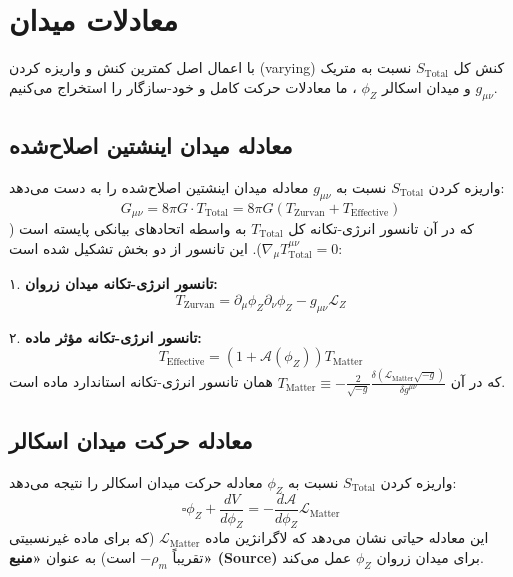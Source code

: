 \documentclass[12pt, a4paper]{article}
\newcommand{\phiZ}{\phi_Z}
\newcommand{\Lmat}{\mathcal{L}_{\text{Matter}}}
\newcommand{\Tmat}{T_{\text{Matter}}}
\newcommand{\Teff}{T_{\text{Effective}}}
\newcommand{\Tzurvan}{T_{\text{Zurvan}}}
\newcommand{\Ttotal}{T_{\text{Total}}}
\newcommand{\Aphi}{\mathcal{A}(\phiZ)}
\begin{document}
\section{معادلات میدان}

با اعمال اصل کمترین کنش و واریزه کردن (varying) کنش کل $S_{\text{Total}}$ نسبت به متریک $g_{\mu\nu}$ و میدان اسکالر $\phiZ$ ، ما معادلات حرکت کامل و خود-سازگار را استخراج می‌کنیم.

\subsection{معادله میدان اینشتین اصلاح‌شده}
واریزه کردن $S_{\text{Total}}$ نسبت به $g_{\mu\nu}$ معادله میدان اینشتین اصلاح‌شده را به دست می‌دهد:
\begin{equation}
G_{\mu\nu} = 8\pi G \cdot \Ttotal = 8\pi G \left( \Tzurvan + \Teff \right)
\end{equation}
که در آن تانسور انرژی-تکانه کل $\Ttotal$ به واسطه اتحادهای بیانکی پایسته است ($\nabla_\mu \Ttotal^{\mu\nu} = 0$). این تانسور از دو بخش تشکیل شده است:

\noindent ۱. \textbf{تانسور انرژی-تکانه میدان زروان:}
\begin{equation}
\Tzurvan = \partial_\mu \phiZ \partial_\nu \phiZ - g_{\mu\nu} \mathcal{L}_Z
\end{equation}

\noindent ۲. \textbf{تانسور انرژی-تکانه مؤثر ماده:}
\begin{equation}
\Teff = (1 + \Aphi) \Tmat
\end{equation}
که در آن $\Tmat \equiv -\frac{2}{\sqrt{-g}} \frac{\delta(\Lmat \sqrt{-g})}{\delta g^{\mu\nu}}$ همان تانسور انرژی-تکانه استاندارد ماده است.

\subsection{معادله حرکت میدان اسکالر}
واریزه کردن $S_{\text{Total}}$ نسبت به $\phiZ$ معادله حرکت میدان اسکالر را نتیجه می‌دهد:
\begin{equation}
\square \phiZ + \frac{dV}{d\phiZ} = - \frac{d\mathcal{A}}{d\phiZ} \Lmat
\end{equation}
این معادله حیاتی نشان می‌دهد که لاگرانژین ماده $\Lmat$ (که برای ماده غیرنسبیتی تقریباً $-\rho_m$ است) به عنوان \textbf{«منبع» (Source)} برای میدان زروان $\phiZ$ عمل می‌کند.

\end{document}
